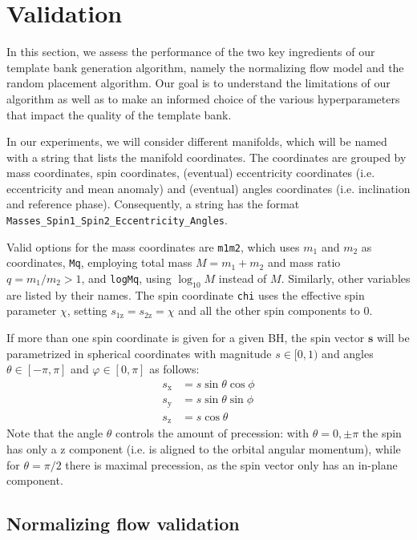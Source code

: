 \documentclass[twocolumn,showpacs,preprintnumbers,nofootinbib,prd,
superscriptaddress,10pt]{revtex4-2}
\begin{document}
\section{Validation} \label{sec:validation}

In this section, we assess the performance of the two key ingredients of our template bank generation algorithm, namely the normalizing flow model and the random placement algorithm.
Our goal is to understand the limitations of our algorithm as well as to make an informed choice of the various hyperparameters that impact the quality of the template bank.

In our experiments, we will consider different manifolds, which will be named with a string that lists the manifold coordinates. The coordinates are grouped by mass coordinates, spin coordinates, (eventual) eccentricity coordinates (i.e. eccentricity and mean anomaly) and (eventual) angles coordinates (i.e. inclination and reference phase).
Consequently, a string has the format \texttt{Masses\_Spin1\_Spin2\_Eccentricity\_Angles}.

Valid options for the mass coordinates are \texttt{m1m2}, which uses $m_1$ and $m_2$ as coordinates, \texttt{Mq}, employing total mass $M = m_1+m_2$ and mass ratio $q = m_1/m_2 >1$, and \texttt{logMq}, using $\log_{10}M$ instead of $M$.
Similarly, other variables are listed by their names.
The spin coordinate \texttt{chi} uses the effective spin parameter $\chi$, setting $s_\text{1z} = s_\text{2z} = \chi$ and all the other spin components to $0$.

If more than one spin coordinate is given for a given BH, the spin vector $\mathbf{s}$ will be parametrized in spherical coordinates with magnitude ${s \in [0,1)}$ and angles ${\theta \in [-\pi,\pi]}$ and ${\varphi \in [0, \pi]}$ as follows:
%
\begin{align}
	s_\text{x} & = s \sin\theta \cos\phi \\
	s_\text{y} & = s \sin\theta \sin\phi \\
	s_\text{z} & = s \cos\theta
\end{align}
%
Note that the angle $\theta$ controls the amount of precession: with $\theta = 0, \pm \pi$ the spin has only a z component (i.e. is aligned to the orbital angular momentum), while for $\theta = \pi/2$ there is maximal precession, as the spin vector only has an in-plane component.

\subsection{Normalizing flow validation} \label{sec:flow_validation}
\end{document}
